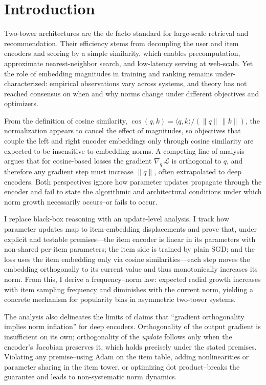 \section{Introduction}
Two-tower architectures are the de facto standard for large-scale retrieval and recommendation. Their efficiency stems from decoupling the user and item encoders and scoring by a simple similarity, which enables precomputation, approximate nearest-neighbor search, and low-latency serving at web-scale. Yet the role of embedding magnitudes in training and ranking remains under-characterized: empirical observations vary across systems, and theory has not reached consensus on when and why norms change under different objectives and optimizers.

From the definition of cosine similarity, \(\cos(q,k)=\langle q,k\rangle/(\|q\|\,\|k\|)\), the normalization appears to cancel the effect of magnitudes, so objectives that couple the left and right encoder embeddings only through cosine similarity are expected to be insensitive to embedding norms. A competing line of analysis argues that for cosine-based losses the gradient \(\nabla_{q}\,\mathcal{L}\) is orthogonal to \(q\), and therefore any gradient step must increase \(\|q\|\), often extrapolated to deep encoders. Both perspectives ignore how parameter updates propagate through the encoder and fail to state the algorithmic and architectural conditions under which norm growth necessarily occurs--or fails to occur.

I replace black-box reasoning with an update-level analysis. I track how parameter updates map to item-embedding displacements and prove that, under explicit and testable premises—the item encoder is linear in its parameters with non-shared per-item parameters; the item side is trained by plain SGD; and the loss uses the item embedding only via cosine similarities—each step moves the embedding orthogonally to its current value and thus monotonically increases its norm. From this, I derive a frequency--norm law: expected radial growth increases with item sampling frequency and diminishes with the current norm, yielding a concrete mechanism for popularity bias in asymmetric two-tower systems.

The analysis also delineates the limits of claims that ``gradient orthogonality implies norm inflation'' for deep encoders. Orthogonality of the output gradient is insufficient on its own; orthogonality of the \emph{update} follows only when the encoder's Jacobian preserves it, which holds precisely under the stated premises. Violating any premise--using Adam on the item table, adding nonlinearities or parameter sharing in the item tower, or optimizing dot product--breaks the guarantee and leads to non-systematic norm dynamics.

